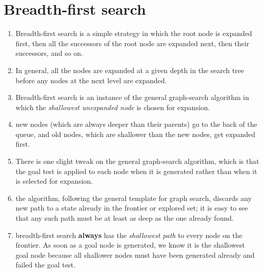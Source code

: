 \section{Breadth-first search \cite{ai/book/Artificial-Intelligence-A-Modern-Approach/Russell-Norvig}}\label{AI: Algorithms/Breadth-first search}

\begin{enumerate}[itemsep=0.2cm]
    \item Breadth-first search is a simple strategy in which the root node is expanded first, then all the successors of the root node are expanded next, then their successors, and so on. 
    \hfill \cite{ai/book/Artificial-Intelligence-A-Modern-Approach/Russell-Norvig}

    \item In general, all the nodes are expanded at a given depth in the search tree before any nodes at the next level are expanded.
    \hfill \cite{ai/book/Artificial-Intelligence-A-Modern-Approach/Russell-Norvig}

    \item Breadth-first search is an instance of the general graph-search algorithm in which the \textit{shallowest unexpanded node} is chosen for expansion.
    \hfill \cite{ai/book/Artificial-Intelligence-A-Modern-Approach/Russell-Norvig}

    \item new nodes (which are always deeper than their parents) go to the back of the queue, and old nodes, which are shallower than the new nodes, get expanded first. 
    \hfill \cite{ai/book/Artificial-Intelligence-A-Modern-Approach/Russell-Norvig}

    \item There is one slight tweak on the general graph-search algorithm, which is that the goal test is applied to each node when it is generated rather than when it is selected for expansion.
    \hfill \cite{ai/book/Artificial-Intelligence-A-Modern-Approach/Russell-Norvig}

    \item the algorithm, following the general template for graph search, discards any new path to a state already in the frontier or explored set; it is easy to see that any such path must be at least as deep as the one already found. 
    \hfill \cite{ai/book/Artificial-Intelligence-A-Modern-Approach/Russell-Norvig}

    \item breadth-first search \textbf{always} has the \textit{shallowest path} to every node on the frontier. 
    As soon as a goal node is generated, we know it is the shallowest goal node because all shallower nodes must have been generated already and failed the goal test. 
    \hfill \cite{ai/book/Artificial-Intelligence-A-Modern-Approach/Russell-Norvig}


\end{enumerate}
